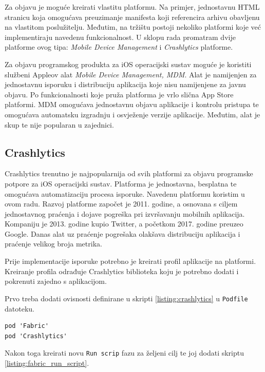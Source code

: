 \documentclass[times, utf8, diplomski, numeric]{fer}
\begin{document}
Za objavu je moguće kreirati vlastitu platformu. Na primjer, jednostavnu HTML stranicu koja omogućava preuzimanje manifesta koji referencira arhivu obavljenu na vlastitom poslužitelju. Međutim, na tržištu postoji nekoliko platformi koje već implementiraju navedenu funkcionalnost. U sklopu rada promatram dvije platforme ovog tipa: \textit{Mobile Device Management} i \textit{Crashlytics} platforme.

Za objavu programskog produkta za iOS operacijski sustav moguće je koristiti službeni Appleov alat \textit{Mobile Device Management, MDM}. Alat je namijenjen za jednostavnu isporuku i distribuciju aplikacija koje nisu namijenjene za javnu objavu. Po funkcionalnosti koje pruža platforma je vrlo slična App Store platformi. MDM omogućava jednostavnu objavu aplikacije i kontrolu pristupa te omogućava automatsku izgradnju i osvježenje verzije aplikacije. Međutim, alat je skup te nije popularan u zajednici.

\subsection{Crashlytics}

Crashlytics trenutno je najpopularnija od svih platformi za objavu programske potpore za iOS operacijski sustav. Platforma je jednostavna, besplatna te omogućava automatizaciju procesa isporuke. Navedenu platformu koristim u ovom radu. Razvoj platforme započet je 2011. godine, a osnovana s ciljem jednostavnog praćenja i dojave pogreška pri izvršavanju mobilnih aplikacija. Kompaniju je 2013. godine kupio Twitter, a početkom 2017. godine preuzeo Google. Danas alat uz praćenje pogrešaka olakšava distribuciju aplikacija i praćenje velikog broja metrika.

Prije implementacije isporuke potrebno je kreirati profil aplikacije na platformi. Kreiranje profila odrađuje Crashlytics biblioteka koju je potrebno dodati i pokrenuti zajedno s aplikacijom.

Prvo treba dodati ovisnosti definirane u skripti \ref{listing:crashlytics} u \verb|Podfile| datoteku.

\begin{lstlisting}[caption=Ovisnosti potrebne za objavu korištenjem Crashlytisc platforme, label=listing:crashlytics]
pod 'Fabric'
pod 'Crashlytics'
\end{lstlisting}

Nakon toga kreirati novu \verb|Run scrip| fazu za željeni cilj te joj dodati skriptu \ref{listing:fabric_run_script}.
\end{document}
